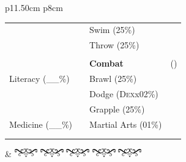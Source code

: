 \documentclass[11pt,twoside,a4paper]{article}
\begin{document}
\begin{tabular}{ p{11.50cm} p{8cm} }
{\begin{minipage}[ht]{12.00cm}
{\begin{minipage}{0.9\textwidth}
\begin{small}
\begin{tabular}[c]{ p{} p{} p{} p{} }
					\dotfill	 				& \dotfill \shadowbox{~}	&	Swim (25\%)				& \dotfill \shadowbox{~}	\\
					\dotfill	 				& \dotfill \shadowbox{~}	&	Throw (25\%)			& \dotfill \shadowbox{~}	\\
					\dotfill	 				& \dotfill \shadowbox{~}	&	\dotfill	 			& \dotfill \shadowbox{~}	\\
					\dotfill	 				& \dotfill \shadowbox{~}	&	\textbf{Combat}			& (\dotfill)				\\
					Literacy (\_\_\%)			& \dotfill \shadowbox{~}	&	Brawl (25\%)			& \dotfill \shadowbox{~}	\\
					\dotfill	 				& \dotfill \shadowbox{~}	&	Dodge (\textsc{Dex}x02\%)& \dotfill \shadowbox{~}	\\
					\dotfill	 				& \dotfill \shadowbox{~}	&	Grapple (25\%)			& \dotfill \shadowbox{~}	\\
					Medicine (\_\_\%)			& \dotfill \shadowbox{~}	&	Martial Arts (01\%)		& \dotfill \shadowbox{~}	\\
					\dotfill	 				& \dotfill \shadowbox{~}	&	\dotfill	 			& \dotfill \shadowbox{~}	\\
					\dotfill	 				& \dotfill \shadowbox{~}	&	\dotfill	 			& \dotfill \shadowbox{~}	\\
				\end{tabular} \end{small} %
			\end{minipage}} %
			\setlength{\shadowsize}{4pt} %
		\end{minipage} \vspace{\fill}
	} &	
		\includegraphics[width=1.0cm]{../../../../../imgGraphics/artsDecos/ornement10whiteBG.png} 
		\includegraphics[width=1.0cm]{../../../../../imgGraphics/artsDecos/ornement10whiteBG.png}
		\includegraphics[width=1.0cm]{../../../../../imgGraphics/artsDecos/ornement10whiteBG.png}
		\includegraphics[width=1.0cm]{../../../../../imgGraphics/artsDecos/ornement10whiteBG.png}
		\includegraphics[width=1.0cm]{../../../../../imgGraphics/artsDecos/ornement10whiteBG.png}

\end{tabular}
\end{document}

